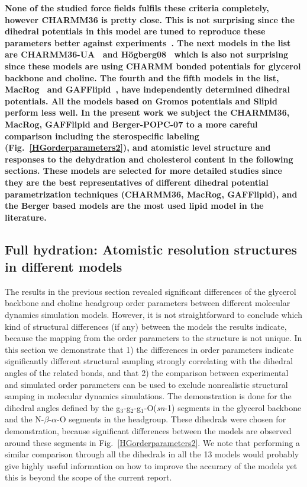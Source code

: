 \documentclass[pre,aps,floatfix,authordate1-4,twocolumn]{revtex4-1}
\begin{document}
{\bf
None of the studied force fields fulfils these criteria completely, however CHARMM36 is pretty close. 
This is not surprising since the dihedral potentials in this model are tuned to reproduce these parameters better against experiments~\cite{klauda10}.
The next models in the list are CHARMM36-UA~\cite{henin08,lee14} and H\"ogberg08~\cite{hogberg08} which is also not surprising since
these models are using CHARMM bonded potentials for glycerol backbone and choline. The fourth and the fifth models in the list, MacRog~\cite{maciejewski14} and
GAFFlipid~\cite{dickson12}, have independently determined dihedral potentials. All the models based on Gromos potentials and Slipid perform less well.
In the present work we subject the CHARMM36, MacRog, GAFFlipid and Berger-POPC-07 to a more careful comparison including the sterospecific labeling  
(Fig.~\ref{HGorderparameters2}), and atomistic level structure and responses to the dehydration and cholesterol content in the following sections.
These models are selected for more detailed studies since they are the best representatives of different dihedral potential parametrization techniques 
(CHARMM36, MacRog, GAFFlipid), and the Berger based models are the most used lipid model in the literature.
}


\subsection{Full hydration: Atomistic resolution structures in different models}

The results in the previous section revealed significant differences of the glycerol backbone and choline headgroup
order parameters between different molecular dynamics simulation models.
However, it is not straightforward to conclude which kind of structural differences (if any)
between the models the results indicate, because the mapping from the order parameters to the 
structure is not unique. In this section we demonstrate that 1) the differences in order parameters
indicate significantly different structural sampling strongly correlating with the dihedral angles of the related bonds,
and that 2) the comparison between experimental and simulated order parameters can be used to exclude
nonrealistic structural samping in molecular dynamics simulations. The demonstration is done for 
the dihedral angles defined by the g$_3$-g$_2$-g$_1$-O(\textit{sn}-1) segments in the glycerol backbone and 
the N-$\beta$-$\alpha$-O segments in the headgroup. These dihedrals were chosen for demonstration, because 
significant differences between the models are observed around these segments in Fig.~\ref{HGorderparameters2}.
We note that performing a similar comparison through all the dihedrals in all the 13 models would probably give highly useful
information on how to improve the accuracy of the models yet this is beyond the scope of the current report. 
\end{document}

